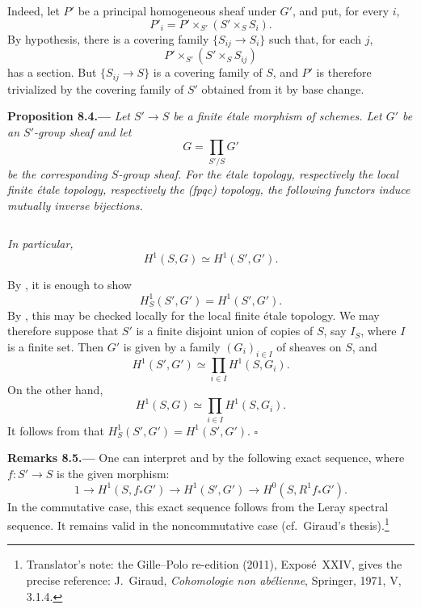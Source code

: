 Indeed, let \(P'\) be a principal homogeneous sheaf under \(G'\), and
put, for every \(i\),
\[
  P'_i=P'\times_{S'}(S'\times_SS_i).
\]
By hypothesis, there is a covering family
\(\{S_{ij}\to S_i\}\) such that, for each \(j\),
\[
  P'\times_{S'}(S'\times_SS_{ij})
\]
has a section. But \(\{S_{ij}\to S\}\) is a covering family of \(S\),
and \(P'\) is therefore trivialized by the covering family of \(S'\)
obtained from it by base change.

\par\medskip\noindent{}\textbf{Proposition 8.4.---}\enspace
\emph{Let \(S'\to S\) be a finite étale morphism of schemes. Let
\(G'\) be an \(S'\)-group sheaf and let
\[
  G=\prod_{S'/S}G'
\]
be the corresponding \(S\)-group sheaf. For the étale topology,
respectively the local finite étale topology, respectively the
\textup{(fpqc)} topology, the following functors induce mutually
inverse bijections.}

\[
  
\]

\emph{In particular,
\[
  H^1(S,G)\simeq H^1(S',G').
\]}

By , it is enough to show
\[
  H^1_S(S',G')=H^1(S',G').
\]
By , this may be checked locally for the local finite étale
topology. We may therefore suppose that \(S'\) is a finite disjoint
union of copies of \(S\), say \(I_S\), where \(I\) is a finite set.
Then \(G'\) is given by a family \((G_i)_{i\in I}\) of sheaves on
\(S\), and
\[
  H^1(S',G')
  \simeq
  \prod_{i\in I}H^1(S,G_i).
\]
On the other hand,
\[
  H^1(S,G)
  \simeq
  \prod_{i\in I}H^1(S,G_i).
\]
It follows from  that
\(H^1_S(S',G')=H^1(S',G')\).
\hfill\(\square\)

\par\medskip\noindent{}\textbf{Remarks 8.5.---}\enspace
One can interpret  and  by the following
exact sequence, where \(f:S'\to S\) is the given morphism:
\[
  1\longrightarrow H^1(S,f_*G')
  \longrightarrow H^1(S',G')
  \longrightarrow H^0(S,R^1f_*G').
\]
In the commutative case, this exact sequence follows from the Leray
spectral sequence. It remains valid in the noncommutative
case (cf.\ Giraud's thesis).\footnote{Translator's note: the Gille--Polo re-edition (2011), Exposé~XXIV, gives the precise reference: J.~Giraud,
\emph{Cohomologie non abélienne}, Springer, 1971, V, 3.1.4.}

